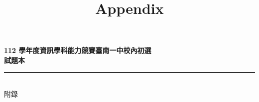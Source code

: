 \documentclass[a4paper]{article}
\title{Appendix}
\begin{document}
 \begin{center}
 \textbf{\huge 112 學年度資訊學科能力競賽臺南一中校內初選}\\
 \vspace{5mm}
 \textbf{\huge 試題本}\\
 \vspace{10mm}
 \rule{17cm}{2pt}\\
 \vspace{5mm}
 \huge 附錄\\
 \end{center}

 \fontsize{14pt}{20pt}\selectfont

 \noindent 
\end{document}
